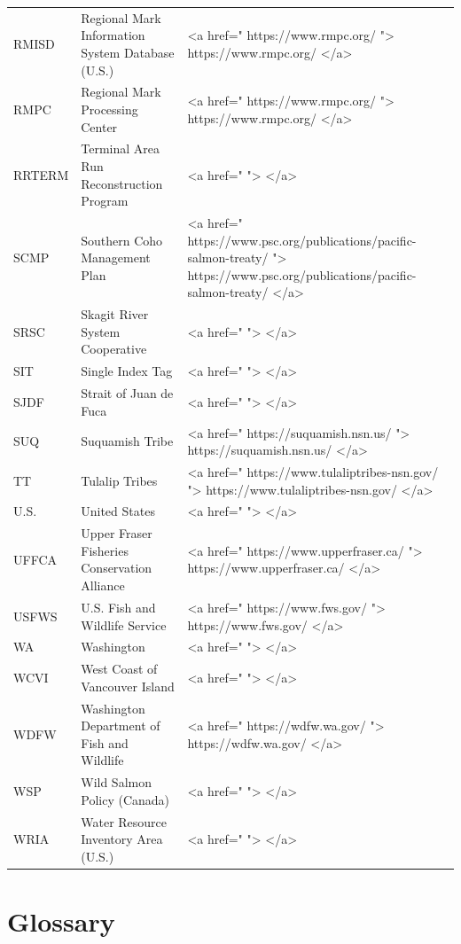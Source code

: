 \documentclass[
  letterpaper,
  DIV=11,
  numbers=noendperiod]{scrartcl}
\begin{document}
\begin{table}
\begin{tabular*}{\linewidth}{@{\extracolsep{\fill}}lll}
RMISD & Regional Mark Information System Database (U.S.) & <a href=" https://www.rmpc.org/ "> https://www.rmpc.org/ </a> \\ 
RMPC & Regional Mark Processing Center & <a href=" https://www.rmpc.org/ "> https://www.rmpc.org/ </a> \\ 
RRTERM & Terminal Area Run Reconstruction Program & <a href="  ">  </a> \\ 
SCMP & Southern Coho Management Plan & <a href=" https://www.psc.org/publications/pacific-salmon-treaty/ "> https://www.psc.org/publications/pacific-salmon-treaty/ </a> \\ 
SRSC & Skagit River System Cooperative & <a href="  ">  </a> \\ 
SIT & Single Index Tag & <a href="  ">  </a> \\ 
SJDF & Strait of Juan de Fuca & <a href="  ">  </a> \\ 
SUQ & Suquamish Tribe & <a href=" https://suquamish.nsn.us/ "> https://suquamish.nsn.us/ </a> \\ 
TT & Tulalip Tribes & <a href=" https://www.tulaliptribes-nsn.gov/ "> https://www.tulaliptribes-nsn.gov/ </a> \\ 
U.S. & United States & <a href="  ">  </a> \\ 
UFFCA & Upper Fraser Fisheries Conservation Alliance & <a href=" https://www.upperfraser.ca/ "> https://www.upperfraser.ca/ </a> \\ 
USFWS & U.S. Fish and Wildlife Service & <a href=" https://www.fws.gov/ "> https://www.fws.gov/ </a> \\ 
WA & Washington & <a href="  ">  </a> \\ 
WCVI & West Coast of Vancouver Island & <a href="  ">  </a> \\ 
WDFW & Washington Department of Fish and Wildlife & <a href=" https://wdfw.wa.gov/ "> https://wdfw.wa.gov/ </a> \\ 
WSP & Wild Salmon Policy (Canada) & <a href="  ">  </a> \\ 
WRIA & Water Resource Inventory Area (U.S.) & <a href="  ">  </a> \\ 
\bottomrule
\end{tabular*}
\end{table}

\section{Glossary}\label{glossary}
\end{document}
